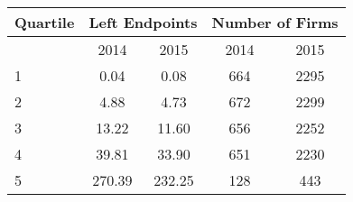 \begin{tabular}{lcccc} \toprule Quartile & \multicolumn{2}{c}{Left Endpoints} & \multicolumn{2}{c}{Number of Firms}  \\ \midrule
& 2014 & 2015 & 2014 & 2015  \\ \midrule
1           &        0.04&        0.08&         664&        2295\\
2           &        4.88&        4.73&         672&        2299\\
3           &       13.22&       11.60&         656&        2252\\
4           &       39.81&       33.90&         651&        2230\\
5           &      270.39&      232.25&         128&         443\\
 \bottomrule \end{tabular}
